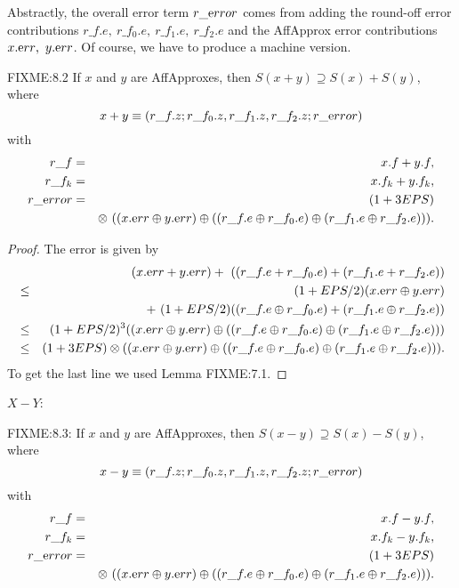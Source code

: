 Abstractly, the overall error term $r\_{\textrm error}$ comes from adding the round-off error contributions $r\_f.e,\  r\_f_0.e,\  r\_f_1.e, 
\ r\_f_2.e$ and the AffApprox error contributions $x.{\textrm err},\  y.{\textrm err}$.  Of course, we have to produce a machine version.

\begin{proposition}{FIXME:8.2} If $x$ and $y$ are 
{\textrm AffApproxes, }
then $S(x + y) \supseteq S(x) + S(y)${\textrm ,} where
$$x + y \equiv (r\_f.z; r\_f_0.z, r\_f_1.z, r\_f_2.z; r\_{\textrm error})$$
with
\begin{eqnarray*}
r\_f &=& x.f + y.f,\\
r\_f_k &=& x.f_k + y.f_k,\\
r\_{\textrm error}& =& (1 + 3EPS)\\
&&\otimes\ ((x.{\textrm err} \oplus y.{\textrm err}) \oplus ((r\_f.e \oplus
r\_f_0.e) \oplus (r\_f_1.e \oplus r\_f_2.e))).
\end{eqnarray*}
\end{proposition}

\begin{proof}{}
The error is given by 
\begin{eqnarray*}
&&\hskip-24pt (x.{\textrm err} + y.{\textrm err})  +\ ((r\_f.e + r\_f_0.e) + (r\_f_1.e + r\_f_2.e))\\
&\le& (1+EPS/2) (x.{\textrm err} \oplus
y.{\textrm err}) \\
&&+\ (1+EPS/2)((r\_f.e \oplus r\_f_0.e) + (r\_f_1.e \oplus r\_f_2.e))\\
&\le& (1+EPS/2)^3 ((x.{\textrm err} \oplus
y.{\textrm err}) \oplus ((r\_f.e \oplus r\_f_0.e) \oplus (r\_f_1.e \oplus r\_f_2.e)))\\
&\le& (1 + 3EPS) \otimes ((x.{\mathrm
err} \oplus y.{\textrm err}) \oplus ((r\_f.e \oplus r\_f_0.e) \oplus (r\_f_1.e \oplus r\_f_2.e))).
\end{eqnarray*}
 To get the last line
we used Lemma FIXME:7.1. \end{proof}

$X - Y$:

\begin{proposition}{FIXME:8.3:} If $x$ and $y$ are {\textrm AffApproxes,} then $S(x - y) \supseteq S(x) - S(y)${\textrm ,}
 where
$$x - y \equiv (r\_f.z; r\_f_0.z, r\_f_1.z, r\_f_2.z; r\_{\textrm error})$$
with
\begin{eqnarray*}
r\_f& =& x.f - y.f,\\
r\_f_k &= &x.f_k - y.f_k,\\
r\_{\textrm error} &=& (1 + 3EPS)\\
&& \otimes\ ((x.{\textrm err} \oplus y.{\textrm err}) \oplus ((r\_f.e
\oplus r\_f_0.e) \oplus (r\_f_1.e \oplus r\_f_2.e))).
\end{eqnarray*}
\end{proposition}

